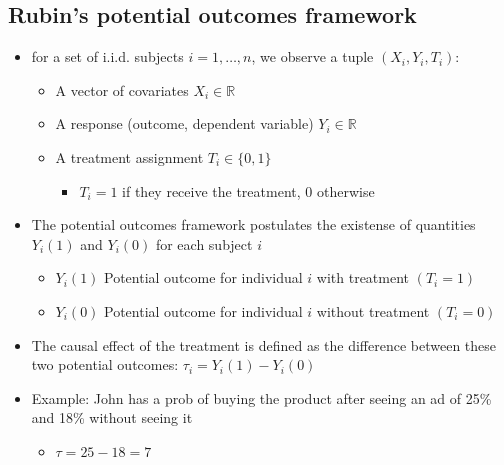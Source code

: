 \documentclass[10pt]{article}
\begin{document}
\subsection{Rubin's potential outcomes framework}
\begin{itemize}
    \item for a set of i.i.d. subjects $i = 1, …, n $, we observe a tuple $(X_i, Y_i, T_i):$
    \begin{itemize}
        \item A vector of covariates $X_i \in \mathbb{R} $
        \item A response (outcome, dependent variable) $Y_i\in \mathbb{R} $
        \item A treatment assignment $T_i\in \{0, 1\}$
        \begin{itemize}
            \item $T_i = 1 $ if they receive the treatment, 0 otherwise
        \end{itemize}
    \end{itemize}
    \item The potential outcomes framework postulates the existense of quantities $Y_i(1)$ and $Y_i(0) $ for each subject $ i $
    \begin{itemize}
        \item $Y_i(1) $ Potential outcome for individual $i $ with treatment $(T_i = 1) $
        \item $Y_i(0) $ Potential outcome for individual $i $ without treatment $(T_i = 0) $
    \end{itemize}
    \item The causal effect of the treatment is defined as the difference between these two potential outcomes: $\tau_i = Y_i(1) - Y_i(0)$
    \item Example: John has a prob of buying the product after seeing an ad of 25\% and 18\% without seeing it
    \begin{itemize}
        \item $\tau = 25 - 18 = 7 $
    \end{itemize}
\end{itemize}
\newpage 
\end{document}
